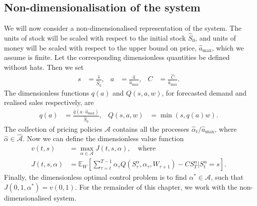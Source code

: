 \documentclass[main.tex]{subfiles}
\begin{document}
\subsection{Non-dimensionalisation of the system}
We will now consider a non-dimensionalised
representation of the system.
The units of stock will be  scaled with
respect to
the initial stock $\hat{S}_0$, and units of money will be scaled with respect to
the upper bound on
price, $\hat{a}_{\mathrm{max}}$, which we assume is finite.
Let the corresponding dimensionless quantities be defined without hats.
Then we set
\begin{align}
  s
  &= \frac{\hat{s}}{\hat{S}_0},
  & a
  &=\frac{\hat{a}}{\hat{a}_{\mathrm{max}}},
  &C&=\frac{\hat{C}}{\hat{a}_{\mathrm{max}}}.%
\end{align}
The dimensionless functions $q(a)$ and $Q(s,a,w)$,
for forecasted demand
and realised sales respectively, are
\begin{align}
  q(a)&= \frac{\hat{q}(a\cdot \hat{a}_{\max})}{\hat{S}_0},
  &Q(s,a, w)&= \min(s, q(a) w).
\end{align}
The collection of pricing policies $\mathcal{A}$ contains all
the processes $\hat{\alpha}_t/\hat{a}_{\mathrm{max}}$, where
$\hat{\alpha}\in \hat{\mathcal{A}}$.
Now we can define the dimensionless value function
\begin{align}\label{eq:value_function_def_nondim}
  v(t,s)&=\max_{\alpha\in\mathcal{A}}
          J(t,s,\alpha),\quad\text{where}\\
  J(t,s,\alpha)&=
                 \mathbb{E}_{W}\left[ \sum_{\tau=t}^{T-1}
                 \alpha_\tau Q(
                 {S}_\tau^\alpha,\alpha_\tau,
                 W_{\tau+1})
                 - C S_{T}^\alpha \big\vert S_{t}^\alpha =
                 s
                 \right].
                 \label{eq:value_function_def_nondim2}
\end{align}
Finally, the dimensionless optimal control problem
is to find $\alpha^*\in{\mathcal{A}}$, such that
$J(0,1,\alpha^*)=v(0,1)$.
For the remainder of this chapter, we work with the
non-dimensionalised system.%
\end{document}
